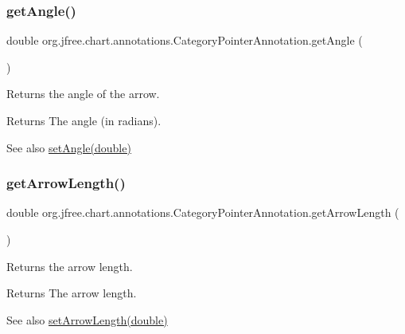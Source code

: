 \subsubsection{\texorpdfstring{get\+Angle()}{getAngle()}}
{\footnotesize\ttfamily double org.\+jfree.\+chart.\+annotations.\+Category\+Pointer\+Annotation.\+get\+Angle (\begin{DoxyParamCaption}{ }\end{DoxyParamCaption})}

Returns the angle of the arrow.

\begin{DoxyReturn}{Returns}
The angle (in radians).
\end{DoxyReturn}
\begin{DoxySeeAlso}{See also}
\mbox{\hyperlink{classorg_1_1jfree_1_1chart_1_1annotations_1_1_category_pointer_annotation_abfe5c275b7801cfb101c72f624f05a18}{set\+Angle(double)}} 
\end{DoxySeeAlso}
\mbox{\label{classorg_1_1jfree_1_1chart_1_1annotations_1_1_category_pointer_annotation_a6e00ae383d6da634eee3cfacdd18b9b2}} 
\subsubsection{\texorpdfstring{get\+Arrow\+Length()}{getArrowLength()}}
{\footnotesize\ttfamily double org.\+jfree.\+chart.\+annotations.\+Category\+Pointer\+Annotation.\+get\+Arrow\+Length (\begin{DoxyParamCaption}{ }\end{DoxyParamCaption})}

Returns the arrow length.

\begin{DoxyReturn}{Returns}
The arrow length.
\end{DoxyReturn}
\begin{DoxySeeAlso}{See also}
\mbox{\hyperlink{classorg_1_1jfree_1_1chart_1_1annotations_1_1_category_pointer_annotation_aa383879f46b82b5262726e8af9d35c9b}{set\+Arrow\+Length(double)}} 
\end{DoxySeeAlso}
\mbox{\label{classorg_1_1jfree_1_1chart_1_1annotations_1_1_category_pointer_annotation_adb30b0bd8b349a9f501baddb97a02c03}} 
